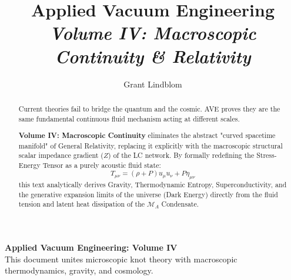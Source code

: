 \title{\textbf{Applied Vacuum Engineering} \\ \large \textit{Volume IV: Macroscopic Continuity \& Relativity}}
\author{Grant Lindblom}
\date{}

\maketitle

\vfill
\noindent\textbf{Applied Vacuum Engineering: Volume IV} \\
This document unites microscopic knot theory with macroscopic thermodynamics, gravity, and cosmology.

\begin{abstract}
    Current theories fail to bridge the quantum and the cosmic. AVE proves they are the same fundamental continuous fluid mechanism acting at different scales.
    
    \textbf{Volume IV: Macroscopic Continuity} eliminates the abstract "curved spacetime manifold" of General Relativity, replacing it explicitly with the macroscopic structural scalar impedance gradient ($Z$) of the LC network. By formally redefining the Stress-Energy Tensor as a purely acoustic fluid state:
    \begin{equation}
        T_{\mu\nu} = (\rho + P)u_\mu u_\nu + P \eta_{\mu\nu}
    \end{equation}
    this text analytically derives Gravity, Thermodynamic Entropy, Superconductivity, and the generative expansion limits of the universe (Dark Energy) directly from the fluid tension and latent heat dissipation of the $\mathcal{M}_A$ Condensate.
\end{abstract}
